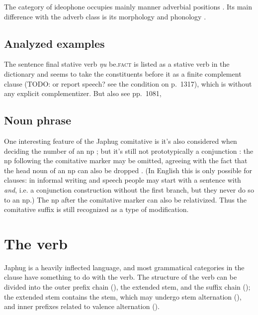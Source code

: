 \documentclass[a4paper, oneside, 12pt]{report}
\newcommand*{\citesec}[1]{\S~{#1}}
\newcommand*{\citechap}[1]{Ch~{#1}}
\newcommand*{\citetable}[1]{Table~{#1}}
\newcommand*{\citepage}[1]{p.~{#1}}
\newcommand*{\citepages}[1]{pp.~{#1}}
\newcommand{\form}[1]{\emph{#1}}
\newcommand{\category}[1]{\textsc{#1}}
\begin{document}
The category of ideophone occupies mainly manner adverbial positions
\citep[\citesec{10.1.7}]{jacques2021grammar}.
Its main difference with the adverb class 
is its morphology \citep[\citesec{10.1.2}]{jacques2021grammar}
and phonology \citep[\citesec{10.1.5}]{jacques2021grammar}.

\section{Analyzed examples}


The sentence final stative verb \form{ŋu} be.\category{fact} is 
listed as a stative verb in the dictionary
and seems to take the constituents before it 
as a finite complement clause (TODO: or report speech? see the condition on \citepage{1317}),
which is without any explicit complementizer. 
But also see \citepages{1081, }

\section{Noun phrase}

One interesting feature of the Japhug comitative 
is it's also considered when deciding the number of an \acs{np}
\citep[\citepage{332}]{jacques2021grammar};
but it's still not prototypically a conjunction \citep[\citepage{420}]{jacques2021grammar}:
the \acs{np} following the comitative marker 
may be omitted, 
agreeing with the fact 
that the head noun of an \acs{np}
can also be dropped \citep[\citepage{425}]{jacques2021grammar}.
(In English this is only possible for clauses:
in informal writing and speech people may start with a sentence with \form{and},
i.e. a conjunction construction 
without the first branch,
but they never do so to an \acs{np}.)
The \acs{np} after the comitative marker can also be relativized.
Thus the comitative suffix is still recognized as a type of 
modification.

\chapter{The verb}

Japhug is a heavily inflected language, 
and most grammatical categories in the clause 
have something to do with the verb.
The structure of the verb can be divided into 
the outer prefix chain (\citealt[\citetable{11.1}]{jacques2021grammar}),
the extended stem, 
and the suffix chain (\citealt[\citesec{11.3}]{jacques2021grammar});
the extended stem contains the stem, 
which may undergo stem alternation (\citealt[\citechap{12}]{jacques2021grammar}),
and inner prefixes related to valence alternation
(\citealt[\citesec{11.2.2}]{jacques2021grammar}).
\end{document}
